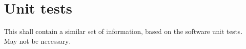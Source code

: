 \section{Unit tests}

This shall contain a similar set of information, based on the software unit tests.
May not be necessary.